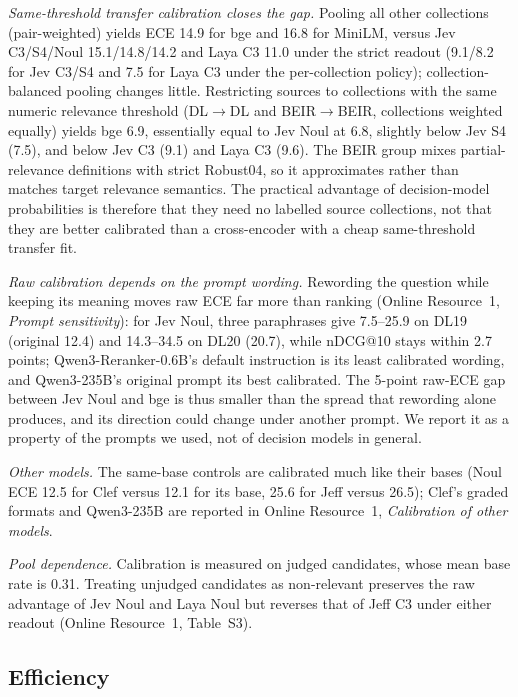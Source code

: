 \emph{Same-threshold transfer calibration closes the gap.}
Pooling all other collections (pair-weighted) yields ECE 14.9 for bge and 16.8 for MiniLM, versus Jev C3/S4/Noul 15.1/14.8/14.2 and Laya C3 11.0 under the strict readout (9.1/8.2 for Jev C3/S4 and 7.5 for Laya C3 under the per-collection policy); collection-balanced pooling changes little. Restricting sources to collections with the same numeric relevance threshold (DL$\to$DL and BEIR$\to$BEIR, collections weighted equally) yields bge 6.9, essentially equal to Jev Noul at 6.8, slightly below Jev S4 (7.5), and below Jev C3 (9.1) and Laya C3 (9.6). The BEIR group mixes partial-relevance definitions with strict Robust04, so it approximates rather than matches target relevance semantics.
The practical advantage of decision-model probabilities is therefore that they need no labelled source collections, not that they are better calibrated than a cross-encoder with a cheap same-threshold transfer fit.

\emph{Raw calibration depends on the prompt wording.} Rewording the question while keeping its meaning moves raw ECE far more than ranking (Online Resource~1, \emph{Prompt sensitivity}): for Jev Noul, three paraphrases give 7.5--25.9 on DL19 (original 12.4) and 14.3--34.5 on DL20 (20.7), while nDCG@10 stays within 2.7 points; Qwen3-Reranker-0.6B's default instruction is its least calibrated wording, and Qwen3-235B's original prompt its best calibrated. The 5-point raw-ECE gap between Jev Noul and bge is thus smaller than the spread that rewording alone produces, and its direction could change under another prompt. We report it as a property of the prompts we used, not of decision models in general.

\emph{Other models.} The same-base controls are calibrated much like their bases (Noul ECE 12.5 for Clef versus 12.1 for its base, 25.6 for Jeff versus 26.5); Clef's graded formats and Qwen3-235B are reported in Online Resource~1, \emph{Calibration of other models}.

\emph{Pool dependence.} Calibration is measured on judged candidates, whose mean base rate is 0.31. Treating unjudged candidates as non-relevant preserves the raw advantage of Jev Noul and Laya Noul but reverses that of Jeff C3 under either readout (Online Resource~1, Table~S3).

\subsection{Efficiency}

